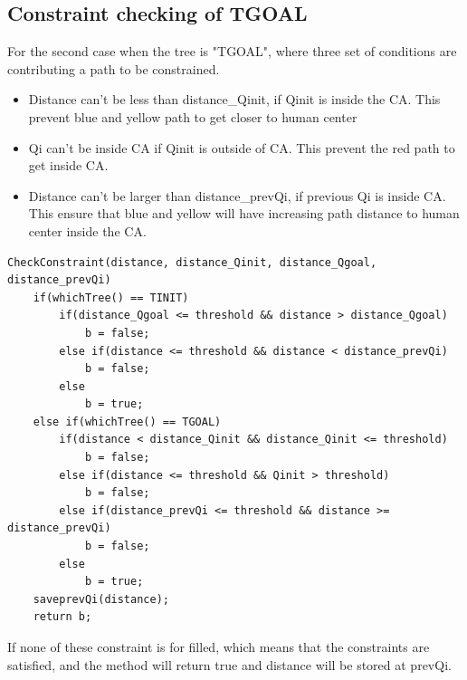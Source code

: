 \subsection{Constraint checking of TGOAL}
For the second case when the tree is "TGOAL", where three set of conditions are contributing a path to be constrained.
\begin{itemize}
\item Distance can't be less than distance\_Qinit, if Qinit is inside the CA. This prevent blue and yellow path to get closer to human center 
\item Qi can't be inside CA if Qinit is outside of CA. This prevent the red path to get inside CA.
\item Distance can't be larger than distance\_prevQi, if previous Qi is inside CA. This ensure that blue and yellow will have increasing path distance to human center inside the CA.
\end{itemize}

\begin{lstlisting}[caption=Peseudo code of constraint checking, label=listing:constraints]
CheckConstraint(distance, distance_Qinit, distance_Qgoal, distance_prevQi)
	if(whichTree() == TINIT)
		if(distance_Qgoal <= threshold && distance > distance_Qgoal)	
			b = false;
		else if(distance <= threshold && distance < distance_prevQi)
			b = false;
		else
			b = true;
	else if(whichTree() == TGOAL)
		if(distance < distance_Qinit && distance_Qinit <= threshold)
			b = false;
		else if(distance <= threshold && Qinit > threshold)	
			b = false;
		else if(distance_prevQi <= threshold && distance >= distance_prevQi)
			b = false;
		else
			b = true;	
	saveprevQi(distance);		
	return b;
\end{lstlisting}

If none of these constraint is for filled, which means that the constraints are satisfied, and the method will return true and distance will be stored at prevQi. 